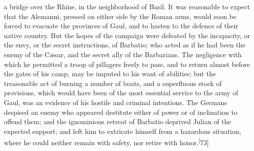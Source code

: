 a bridge over the Rhine, in the neighborhood of Basil. It was
reasonable to expect that the Alemanni, pressed on either side by
the Roman arms, would soon be forced to evacuate the provinces of
Gaul, and to hasten to the defence of their native country. But
the hopes of the campaign were defeated by the incapacity, or the
envy, or the secret instructions, of Barbatio; who acted as if he
had been the enemy of the Cæsar, and the secret ally of the
Barbarians. The negligence with which he permitted a troop of
pillagers freely to pass, and to return almost before the gates
of his camp, may be imputed to his want of abilities; but the
treasonable act of burning a number of boats, and a superfluous
stock of provisions, which would have been of the most essential
service to the army of Gaul, was an evidence of his hostile and
criminal intentions. The Germans despised an enemy who appeared
destitute either of power or of inclination to offend them; and
the ignominious retreat of Barbatio deprived Julian of the
expected support; and left him to extricate himself from a
hazardous situation, where he could neither remain with safety,
nor retire with honor.\textsuperscript[73]




